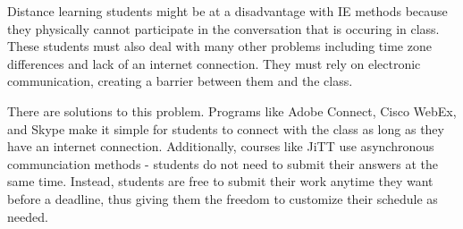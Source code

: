 Distance learning students might be at a disadvantage with IE methods because they physically cannot participate in the conversation that is occuring in class. These students must also deal with many other problems including time zone differences and lack of an internet connection. They must rely on electronic communication, creating a barrier between them and the class.

There are solutions to this problem. Programs like Adobe Connect, Cisco WebEx, and Skype make it simple for students to connect with the class as long as they have an internet connection. Additionally, courses like JiTT use asynchronous communciation methods - students do not need to submit their answers at the same time. Instead, students are free to submit their work anytime they want before a deadline, thus giving them the freedom to customize their schedule as needed.



